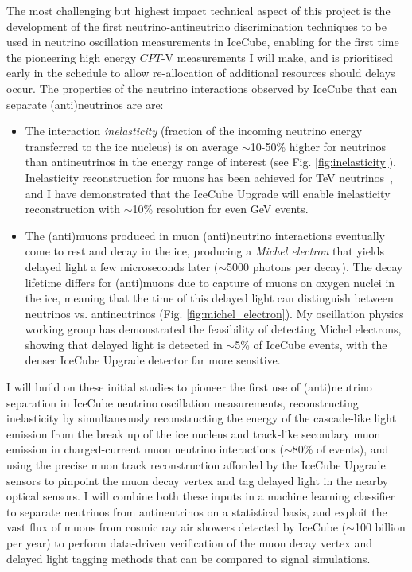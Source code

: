 \documentclass[a4paper,11pt]{article}
\begin{document}
The most challenging but highest impact technical aspect of this project is the development of the first neutrino-antineutrino discrimination techniques to be used in neutrino oscillation measurements in IceCube, enabling for the first time the pioneering high energy $CPT$-V measurements I will make, and is prioritised early in the schedule to allow re-allocation of additional resources should delays occur. The properties of the neutrino interactions observed by IceCube that can separate (anti)neutrinos are are:

\begin{itemize}[leftmargin=*]
    \item The interaction \textit{inelasticity} (fraction of the incoming neutrino energy transferred to the ice nucleus) is on average $\sim$10-50\%  higher for neutrinos than antineutrinos in the energy range of interest (see Fig. \ref{fig:inelasticity}). Inelasticity reconstruction for muons has been achieved for TeV neutrinos~\cite{Aartsen:2018vez}, and I have demonstrated that the IceCube Upgrade will enable inelasticity reconstruction with $\sim$10\% resolution for even GeV events.
    \item The (anti)muons produced in muon (anti)neutrino interactions eventually come to rest and decay in the ice, producing a \textit{Michel electron} that yields delayed light a few microseconds later ($\sim$5000 photons per decay). The decay lifetime differs for (anti)muons due to capture of muons on oxygen nuclei in the ice, meaning that the time of this delayed light can distinguish between neutrinos vs. antineutrinos (Fig. \ref{fig:michel_electron}). My oscillation physics working group has demonstrated the feasibility of detecting Michel electrons, showing that delayed light is detected in $\sim$5\% of IceCube events, with the denser IceCube Upgrade detector far more sensitive.
\end{itemize}

I will build on these initial studies to pioneer the first use of (anti)neutrino separation in IceCube neutrino oscillation measurements, reconstructing inelasticity by simultaneously reconstructing the energy of the cascade-like light emission from the break up of the ice nucleus and track-like secondary muon emission in charged-current muon neutrino interactions ($\sim$80\% of events), and using the precise muon track reconstruction afforded by the IceCube Upgrade sensors to pinpoint the muon decay vertex and tag delayed light in the nearby optical sensors. I will combine both these inputs in a machine learning classifier to separate neutrinos from antineutrinos on a statistical basis, and exploit the vast flux of muons from cosmic ray air showers detected by IceCube ($\sim$100 billion per year) to perform data-driven verification of the muon decay vertex and delayed light tagging methods that can be compared to signal simulations.
\end{document}
